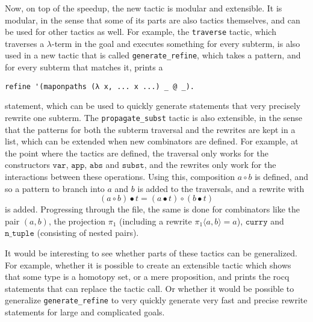 Now, on top of the speedup, the new tactic is modular and extensible. It is modular, in the sense that some of its parts are also tactics themselves, and can be used for other tactics as well. For example, the \texttt{traverse} tactic, which traverses a $ \lambda $-term in the goal and executes something for every subterm, is also used in a new tactic that is called \texttt{generate\_refine}, which takes a pattern, and for every subterm that matches it, prints a
\begin{lstlisting}
refine '(maponpaths (λ x, ... x ...) _ @ _).
\end{lstlisting}
statement, which can be used to quickly generate statements that very precisely rewrite one subterm. The \texttt{propagate\_subst} tactic is also extensible, in the sense that the patterns for both the subterm traversal and the rewrites are kept in a list, which can be extended when new combinators are defined. For example, at the point where the tactics are defined, the traversal only works for the constructors $ \mathtt{var} $, $ \mathtt{app} $, $ \mathtt{abs} $ and $ \mathtt{subst} $, and the rewrites only work for the interactions between these operations. Using this, composition $ a \circ b $ is defined, and so a pattern to branch into $ a $ and $ b $ is added to the traversals, and a rewrite with
\[ (a \circ b) \bullet t = (a \bullet t) \circ (b \bullet t) \]
is added. Progressing through the file, the same is done for combinators like the pair $ (a, b) $, the projection $ \pi_1 $ (including a rewrite $ \pi_1 \langle a, b \rangle = a $), $ \mathtt{curry} $ and $ \mathtt{n\_tuple} $ (consisting of nested pairs).

It would be interesting to see whether parts of these tactics can be generalized. For example, whether it is possible to create an extensible tactic which shows that some type is a homotopy set, or a mere proposition, and prints the rocq statements that can replace the tactic call. Or whether it would be possible to generalize \texttt{generate\_refine} to very quickly generate very fast and precise rewrite statements for large and complicated goals.


